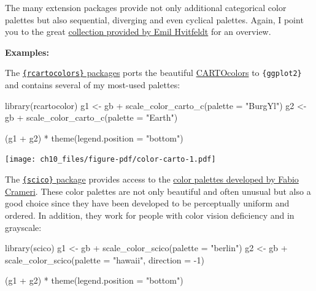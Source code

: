 \documentclass[
  letterpaper,
  DIV=11,
  numbers=noendperiod]{scrreprt}
\newenvironment{Shaded}{\begin{snugshade}}{\end{snugshade}}
\newcommand{\AttributeTok}[1]{\textcolor[rgb]{0.40,0.45,0.13}{#1}}
\newcommand{\DecValTok}[1]{\textcolor[rgb]{0.68,0.00,0.00}{#1}}
\newcommand{\FunctionTok}[1]{\textcolor[rgb]{0.28,0.35,0.67}{#1}}
\newcommand{\NormalTok}[1]{\textcolor[rgb]{0.00,0.23,0.31}{#1}}
\newcommand{\OtherTok}[1]{\textcolor[rgb]{0.00,0.23,0.31}{#1}}
\newcommand{\SpecialCharTok}[1]{\textcolor[rgb]{0.37,0.37,0.37}{#1}}
\newcommand{\StringTok}[1]{\textcolor[rgb]{0.13,0.47,0.30}{#1}}
\begin{document}
The many extension packages provide not only additional categorical
color palettes but also sequential, diverging and even cyclical
palettes. Again, I point you to the great
\href{https://github.com/EmilHvitfeldt/r-color-palettes/blob/master/README.md\#comprehensive-list-of-color-palettes-in-r}{collection
provided by Emil Hvitfeldt} for an overview.

\textbf{Examples:}

The
\href{https://github.com/Nowosad/rcartocolor}{\texttt{\{rcartocolors\}}
packages} ports the beautiful
\href{https://www.google.com/search?client=firefox-b-d&q=carto+oclors}{CARTOcolors}
to \texttt{\{ggplot2\}} and contains several of my most-used palettes:

\begin{Shaded}
\begin{Highlighting}[]
\FunctionTok{library}\NormalTok{(rcartocolor)}
\NormalTok{g1 }\OtherTok{\textless{}{-}}\NormalTok{ gb }\SpecialCharTok{+} \FunctionTok{scale\_color\_carto\_c}\NormalTok{(}\AttributeTok{palette =} \StringTok{"BurgYl"}\NormalTok{)}
\NormalTok{g2 }\OtherTok{\textless{}{-}}\NormalTok{ gb }\SpecialCharTok{+} \FunctionTok{scale\_color\_carto\_c}\NormalTok{(}\AttributeTok{palette =} \StringTok{"Earth"}\NormalTok{)}

\NormalTok{(g1 }\SpecialCharTok{+}\NormalTok{ g2) }\SpecialCharTok{*} \FunctionTok{theme}\NormalTok{(}\AttributeTok{legend.position =} \StringTok{"bottom"}\NormalTok{)}
\end{Highlighting}
\end{Shaded}

\texttt{[image: ch10\_files/figure-pdf/color-carto-1.pdf]}

The \href{https://github.com/thomasp85/scico}{\texttt{\{scico\}}
package} provides access to the
\href{http://www.fabiocrameri.ch/colourmaps.php}{color palettes
developed by Fabio Crameri}. These color palettes are not only beautiful
and often unusual but also a good choice since they have been developed
to be perceptually uniform and ordered. In addition, they work for
people with color vision deficiency and in grayscale:

\begin{Shaded}
\begin{Highlighting}[]
\FunctionTok{library}\NormalTok{(scico)}
\NormalTok{g1 }\OtherTok{\textless{}{-}}\NormalTok{ gb }\SpecialCharTok{+} \FunctionTok{scale\_color\_scico}\NormalTok{(}\AttributeTok{palette =} \StringTok{"berlin"}\NormalTok{)}
\NormalTok{g2 }\OtherTok{\textless{}{-}}\NormalTok{ gb }\SpecialCharTok{+} \FunctionTok{scale\_color\_scico}\NormalTok{(}\AttributeTok{palette =} \StringTok{"hawaii"}\NormalTok{, }\AttributeTok{direction =} \SpecialCharTok{{-}}\DecValTok{1}\NormalTok{)}

\NormalTok{(g1 }\SpecialCharTok{+}\NormalTok{ g2) }\SpecialCharTok{*} \FunctionTok{theme}\NormalTok{(}\AttributeTok{legend.position =} \StringTok{"bottom"}\NormalTok{)}
\end{Highlighting}
\end{Shaded}
\end{document}
